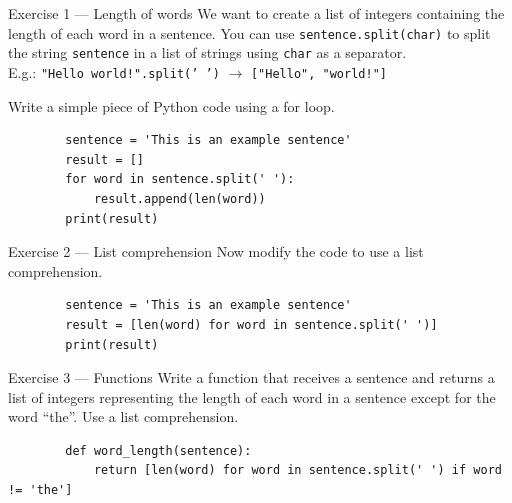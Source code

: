 \documentclass[aspectratio=169,handout]{beamer}
\begin{document}
\begin{frame}[fragile]{Exercise 1 --- Length of words }
    We want to create a list of integers containing the length of each word in a sentence. You can use
    \texttt{sentence.split(char)} to split the string \texttt{sentence} in a list of strings using \texttt{char} as a
    separator.\\
    E.g.: \texttt{"Hello world!".split(' ')} $\rightarrow$ \texttt{["Hello", "world!"]}

    Write a simple piece of Python code using a for loop.

    \pause
    \begin{verbatim}
        sentence = 'This is an example sentence'
        result = []
        for word in sentence.split(' '):
            result.append(len(word))
        print(result)
    \end{verbatim}
\end{frame}

\begin{frame}[fragile]{Exercise 2 --- List comprehension}
    Now modify the code to use a list comprehension.

    \pause
    \begin{verbatim}
        sentence = 'This is an example sentence'
        result = [len(word) for word in sentence.split(' ')]
        print(result)
    \end{verbatim}
\end{frame}

\begin{frame}[fragile]{Exercise 3 --- Functions}
    Write a function that receives a sentence and returns a list of integers representing the length of each word in a
    sentence except for the word ``the''. Use a list comprehension.

    \pause
    \begin{verbatim}
        def word_length(sentence):
            return [len(word) for word in sentence.split(' ') if word != 'the']
    \end{verbatim}
\end{frame}
\end{document}
